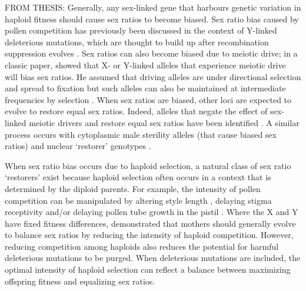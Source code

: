 \documentclass[12pt]{article}
\begin{document}
{\color{blue}
FROM THESIS:
Generally, any sex-linked gene that harbours genetic variation in haploid fitness should cause sex ratios to become biased. 
Sex ratio bias caused by pollen competition has previously been discussed in the context of Y-linked deleterious mutations, which are thought to build up after recombination suppression evolves \citep{Lloyd:1974tz,Stehlik:2005ul}. 
Sex ratios can also become biased due to meiotic drive;
in a classic paper, \citet{Hamilton:1967ts} showed that X- or Y-linked alleles that experience meiotic drive will bias sex ratios. 
He assumed that driving alleles are under directional selection and spread to fixation but such alleles can also be maintained at intermediate frequencies by selection \citep{Feldman:1989gm,Holman:2015en}. 
When sex ratios are biased, other loci are expected to evolve to restore equal sex ratios. 
Indeed, alleles that negate the effect of sex-linked meiotic drivers and restore equal sex ratios have been identified \citep{Stalker:1961th,Smith:1975ft}. 
A similar process occurs with cytoplasmic male sterility alleles (that cause biased sex ratios) and nuclear `restorer' genotypes \citep{Frank:1989vl}. 

When sex ratio bias occurs due to haploid selection, a natural class of sex ratio `restorers' exist because haploid selection often occurs in a context that is determined by the diploid parents. 
For example, the intensity of pollen competition can be manipulated by altering style length \citep{Travers:2001,Lankinen:2001gc,Ruane:2009vt}, delaying stigma receptivity \citep{Galen:1986wq,Lankinen:2011if} and/or delaying pollen tube growth in the pistil \citep{Herrero:2003jf}. 
Where the X and Y have fixed fitness differences, \citet{Hough:2013uo} demonstrated that mothers should generally evolve to balance sex ratios by reducing the intensity of haploid competition. 
However, reducing competition among haploids also reduces the potential for harmful deleterious mutations to be purged. 
When deleterious mutations are included, the optimal intensity of haploid selection can reflect a balance between maximizing offspring fitness and equalizing sex ratios. 

}
\end{document}
